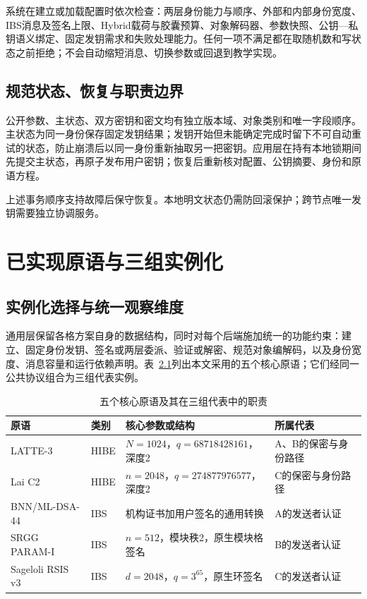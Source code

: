 \documentclass[UTF8,a4paper,12pt,oneside,openany,fontset=fandol]{ctexrep}
\begin{document}
系统在建立或加载配置时依次检查：两层身份能力与顺序、外部和内部身份宽度、IBS消息及签名上限、Hybrid载荷与胶囊预算、对象解码器、参数快照、公钥—私钥语义绑定、固定发钥需求和失败处理能力。任何一项不满足都在取随机数和写状态之前拒绝；不会自动缩短消息、切换参数或回退到教学实现。

\section{规范状态、恢复与职责边界}
公开参数、主状态、双方密钥和密文均有独立版本域、对象类别和唯一字段顺序。主状态为同一身份保存固定发钥结果；发钥开始但未能确定完成时留下不可自动重试的状态，防止崩溃后以同一身份重新抽取另一把密钥。应用层在持有本地锁期间先提交主状态，再原子发布用户密钥；恢复后重新核对配置、公钥摘要、身份和原语方程。

上述事务顺序支持故障后保守恢复。本地明文状态仍需防回滚保护；跨节点唯一发钥需要独立协调服务。

\chapter{已实现原语与三组实例化}

\section{实例化选择与统一观察维度}
通用层保留各格方案自身的数据结构，同时对每个后端施加统一的功能约束：建立、固定身份发钥、签名或两层委派、验证或解密、规范对象编解码，以及身份宽度、消息容量和运行依赖声明。表~\ref{tab:five-primitives}列出本文采用的五个核心原语；它们经同一公共协议组合为三组代表实例。

\begin{table}[htbp]
\centering
\small
\caption{五个核心原语及其在三组代表中的职责}
\label{tab:five-primitives}
\begin{tabularx}{\textwidth}{@{}>{\raggedright\arraybackslash}p{}>{\raggedright\arraybackslash}p{}>{\raggedright\arraybackslash}X>{\raggedright\arraybackslash}p{}@{}}
\toprule
\rowcolor{black!8} 原语 & 类别 & 核心参数或结构 & 所属代表 \\
\midrule
LATTE-3 & HIBE & $N=1024$，$q=68718428161$，深度2 & A、B的保密与身份路径 \\
Lai C2 & HIBE & $n=2048$，$q=274877976577$，深度2 & C的保密与身份路径 \\
BNN/ML-DSA-44 & IBS & 机构证书加用户签名的通用转换 & A的发送者认证 \\
SRGG PARAM-I & IBS & $n=512$，模块秩2，原生模块格签名 & B的发送者认证 \\
Sageloli RSIS v3 & IBS & $d=2048$，$q=3^{65}$，原生环签名 & C的发送者认证 \\
\bottomrule
\end{tabularx}
\end{table}
\end{document}
